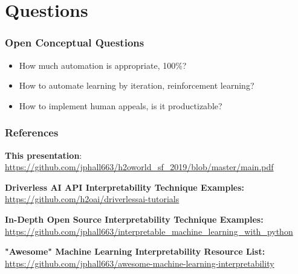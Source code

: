 \documentclass[11pt,
               aspectratio=169,
               hyperref={colorlinks}
               ]{beamer}
\begin{document}
	\section{Questions}

		\begin{frame}

			\frametitle{Open Conceptual Questions}		

			\begin{itemize}
				\item How much automation is appropriate, 100\%?
				\item How to automate learning by iteration, reinforcement learning?
				\item How to implement human appeals, is it productizable?
			\end{itemize}
			
		\end{frame}


	\begin{frame}[t, allowframebreaks]
	
		\frametitle{References}
		
			\vspace{10pt}	
			
			\textbf{This presentation}:\\
			\small{\url{https://github.com/jphall663/h2oworld_sf_2019/blob/master/main.pdf}}
					
			\vspace{10pt}	
					
			\textbf{Driverless AI API Interpretability Technique Examples:}\\
			\small{\url{https://github.com/h2oai/driverlessai-tutorials}}
			
			\vspace{10pt}		
		
		
			\textbf{In-Depth Open Source Interpretability Technique Examples:}\\
			\small{\url{https://github.com/jphall663/interpretable_machine_learning_with_python}}
			
			\vspace{10pt}
			
			\textbf{"Awesome" Machine Learning Interpretability Resource List:}\\
			\small{\url{https://github.com/jphall663/awesome-machine-learning-interpretability}}
			
		
		\framebreak		
		
		\printbibliography
		
	\end{frame}
\end{document}
